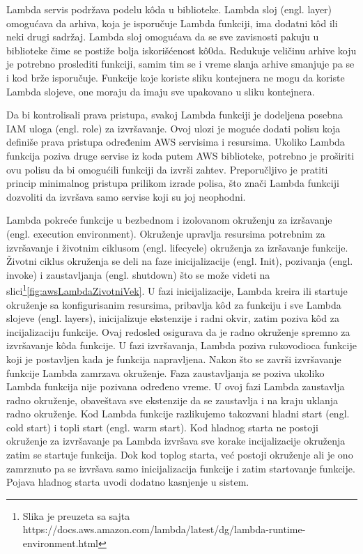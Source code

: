 \documentclass[12pt,oneside]{memoir}
\begin{document}
Lambda servis podržava podelu kôda u biblioteke. Lambda sloj (engl. layer) omogućava da arhiva, koja je isporučuje Lambda funkciji, ima dodatni kôd ili neki drugi sadržaj. Lambda sloj omogućava da se sve zavisnosti pakuju u biblioteke čime se postiže bolja iskorišćenost kô0da. Redukuje veličinu arhive koju je potrebno proslediti funkciji, samim tim se i vreme slanja arhive smanjuje pa se i kod brže isporučuje. Funkcije koje koriste sliku kontejnera ne mogu da koriste Lambda slojeve, one moraju da imaju sve upakovano u sliku kontejnera.

 
Da bi kontrolisali prava pristupa, svakoj Lambda funkciji je dodeljena posebna IAM uloga (engl. role) za izvršavanje. Ovoj ulozi je moguće dodati polisu koja definiše prava pristupa određenim AWS servisima i resursima. Ukoliko Lambda funkcija poziva druge servise iz koda putem AWS biblioteke, potrebno je proširiti ovu polisu da bi omogućili funkciji da izvrši zahtev. Preporučljivo je pratiti princip minimalnog pristupa prilikom izrade polisa, što znači Lambda funkciji dozvoliti da izvršava samo servise koji su joj neophodni. 

 
Lambda pokreće funkcije u bezbednom i izolovanom okruženju za izršavanje (engl. execution environment). Okruženje upravlja resursima potrebnim za izvršavanje i životnim ciklusom (engl. lifecycle) okruženja za izršavanje funkcije. Životni ciklus okruženja se deli na faze inicijalizacije (engl. Init), pozivanja (engl. invoke) i zaustavljanja (engl. shutdown) što se može videti na slici\footnote{Slika je preuzeta sa sajta https://docs.aws.amazon.com/lambda/latest/dg/lambda-runtime-environment.html}\ref{fig:awsLambdaZivotniVek}. U fazi inicijalizacije, Lambda kreira ili startuje okruženje sa konfigurisanim resursima, pribavlja kôd za funkciju i sve Lambda slojeve (engl. layers), inicijalizuje ekstenzije i radni okvir, zatim poziva kôd za incijalizaciju funkcije. Ovaj redosled osigurava da je radno okruženje spremno za izvršavanje kôda funkcije. U fazi izvršavanja, Lambda poziva rukovodioca funkcije koji je postavljen kada je funkcija napravljena. Nakon što se završi izvršavanje funkcije Lambda zamrzava okruženje. Faza zaustavljanja se poziva ukoliko Lambda funkcija nije pozivana određeno vreme. U ovoj fazi Lambda zaustavlja radno okruženje, obaveštava sve ekstenzije da se zaustavlja i na kraju uklanja radno okruženje. Kod Lambda funkcije razlikujemo takozvani hladni start (engl. cold start) i topli start (engl. warm start). Kod hladnog starta ne postoji okruženje za izvršavanje pa Lambda izvršava sve korake incijalizacije okruženja zatim se startuje funkcija. Dok kod toplog starta, već postoji okruženje ali je ono zamrznuto pa se izvršava samo inicijalizacija funkcije i zatim startovanje funkcije. Pojava hladnog starta uvodi dodatno kasnjenje u sistem. 
 
\end{document}
